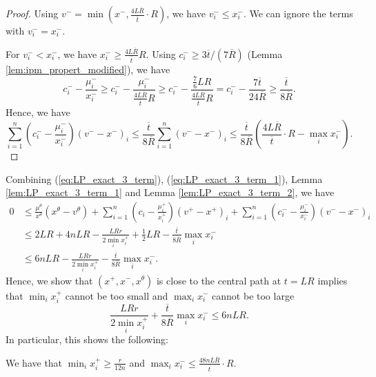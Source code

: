 \begin{proof}
Using $v^{-}=\min(x^{-},\frac{4L\overline{R}}{\overline{t}}\cdot R)$,
we have $v^{-}_{i}\leq x^{-}_{i}$. We can ignore the terms with $v^{-}_{i}=x^{-}_{i}$. 

For $v^{-}_{i}<x^{-}_{i}$, we have $x^{-}_{i}\geq\frac{4L\overline{R}}{\overline{t}}R$.
Using $c^{-}_{i}\geq3\overline{t}/(7\overline{R})$ (Lemma \ref{lem:ipm_propert_modified}),
we have
\[
c^{-}_{i}-\frac{\mu^{-}_{i}}{x^{-}_{i}}\geq c^{-}_{i}-\frac{\mu^{-}_{i}}{\frac{4L\overline{R}}{\overline{t}}R}\geq c^{-}_{i}-\frac{\frac{7}{6}LR}{\frac{4L\overline{R}}{\overline{t}}R}=c^{-}_{i}-\frac{7\overline{t}}{24\overline{R}}\geq\frac{\overline{t}}{8\overline{R}}.
\]
Hence, we have
\[
\sum^{n}_{i=1}(c^{-}_{i}-\frac{\mu^{-}_{i}}{x^{-}_{i}})(v^{-}-x^{-})_{i}\leq\frac{\overline{t}}{8\overline{R}}\sum^{n}_{i=1}(v^{-}-x^{-})_{i}\leq\frac{\overline{t}}{8\overline{R}}(\frac{4L\overline{R}}{\overline{t}}\cdot R-\max_{i}x^{-}_{i}).
\]
\end{proof}
Combining (\ref{eq:LP_exact_3_term}), (\ref{eq:LP_exact_3_term_1}),
Lemma \ref{lem:LP_exact_3_term_1} and Lemma \ref{lem:LP_exact_3_term_2},
we have
\begin{align*}
0 & \leq\frac{\mu^{\theta}}{x^{\theta}}(x^{\theta}-v^{\theta})+\sum^{n}_{i=1}(c_{i}-\frac{\mu^{+}_{i}}{x^{+}_{i}})(v^{+}-x^{+})_{i}+\sum^{n}_{i=1}(c^{-}_{i}-\frac{\mu^{-}_{i}}{x^{-}_{i}})(v^{-}-x^{-})_{i}\\
 & \leq2LR+4nLR-\frac{LRr}{2\min_{i}x^{+}_{i}}+\frac{1}{2}LR-\frac{\overline{t}}{8\overline{R}}\max_{i}x^{-}_{i}\\
 & \leq6nLR-\frac{LRr}{2\min_{i}x^{+}_{i}}-\frac{\overline{t}}{8\overline{R}}\max_{i}x^{-}_{i}.
\end{align*}
Hence, we show that $(x^{+},x^{-},x^{\theta})$ is close to the central
path at $t=LR$ implies that $\min_{i}x^{+}_{i}$ cannot be too small
and $\max_{i}x^{-}_{i}$ cannot be too large
\[
\frac{LRr}{2\min_{i}x^{+}_{i}}+\frac{\overline{t}}{8\overline{R}}\max_{i}x^{-}_{i}\leq6nLR.
\]
In particular, this shows the following:
\begin{lem}
\label{lem:LP_exact_distance_OPT}We have that $\min_{i}x^{+}_{i}\geq\frac{r}{12n}$
and $\max_{i}x^{-}_{i}\leq\frac{48nL\overline{R}}{\overline{t}}\cdot R$.
\end{lem}

